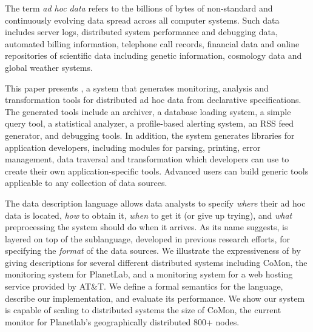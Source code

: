 The term {\em ad hoc data} refers to the billions of bytes of
non-standard and continuously evolving data spread across all computer
systems.  Such data includes server logs, distributed system
performance and debugging data, automated billing information,
telephone call records, financial data and online repositories of
scientific data including genetic information, cosmology data and
global weather systems.

This paper presents \padsd{}, a system that generates monitoring,
analysis and transformation tools for distributed ad hoc data from
declarative specifications.  The generated tools include an archiver,
a database loading system, a simple query tool, a statistical
analyzer, a profile-based alerting system, an RSS feed generator, and
debugging tools.  In addition, the system generates libraries for
application developers, including modules for parsing, printing, error
management, data traversal and transformation which developers can use
to create their own application-specific tools.  Advanced users can
build generic tools applicable to any collection of data sources.

The \padsd{} data description language allows data analysts to specify
{\em where} their ad hoc data is located, {\em how} to obtain it, {\em
when} to get it (or give up trying), and {\em what}
preprocessing the system should do when it arrives.  As its name
suggests, \padsd{} is layered on top of the \pads{} sublanguage,
developed in previous research efforts, for specifying the {\em
format} of the data sources.  We illustrate the expressiveness of
\padsd{} by giving descriptions for several different distributed
systems including CoMon, the monitoring system for PlanetLab, and a
monitoring system for a web hosting service provided by AT\&T.  We
define a formal semantics for the language, describe our
implementation, and evaluate its performance.  We show our system is
capable of scaling to distributed systems the size of CoMon,
the current monitor for Planetlab's geographically distributed 800+
nodes.



